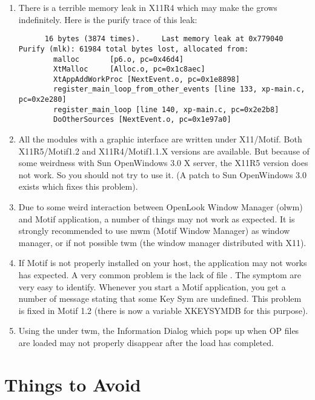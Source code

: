 \begin{enumerate}

\item There is a terrible memory leak in X11R4 which may make the \XPK{} grows
indefinitely. Here is the purify trace of this leak:

\begin{verbatim}
      16 bytes (3874 times).     Last memory leak at 0x779040 
Purify (mlk): 61984 total bytes lost, allocated from:
        malloc       [p6.o, pc=0x46d4]
        XtMalloc     [Alloc.o, pc=0x1c8aec]
        XtAppAddWorkProc [NextEvent.o, pc=0x1e8898]
        register_main_loop_from_other_events [line 133, xp-main.c, pc=0x2e280]
        register_main_loop [line 140, xp-main.c, pc=0x2e2b8]
        DoOtherSources [NextEvent.o, pc=0x1e97a0]
\end{verbatim}

\item All the modules with a graphic interface are written under
X11/Motif. Both X11R5/Motif1.2 and X11R4/Motif1.1.X versions are
available. But because of some weirdness with Sun OpenWindows 3.0 X
server, the X11R5 version does not work. So you should not try to use it.
(A patch to Sun OpenWindows 3.0 exists which fixes this problem).

\item Due to some weird interaction between OpenLook Window Manager (olwm)
and Motif application, a number of things may not work as expected. It
is strongly recommended to use mwm (Motif Window Manager) as window
manager, or if not possible twm (the window manager distributed with X11).

\item If Motif is not properly installed on your host, the application may
not works has expected. A very common problem is the lack of file
. The symptom are very easy to identify.
Whenever you start a Motif application, you get a number of message
stating that some Key Sym are undefined. This problem is fixed
in Motif 1.2 (there is now a variable XKEYSYMDB for this purpose).

\item Using the \OPE{} under twm, the Information Dialog which pops up when OP
files are loaded may not properly disappear after the load has completed.

\end{enumerate}

\section{Things to Avoid}

